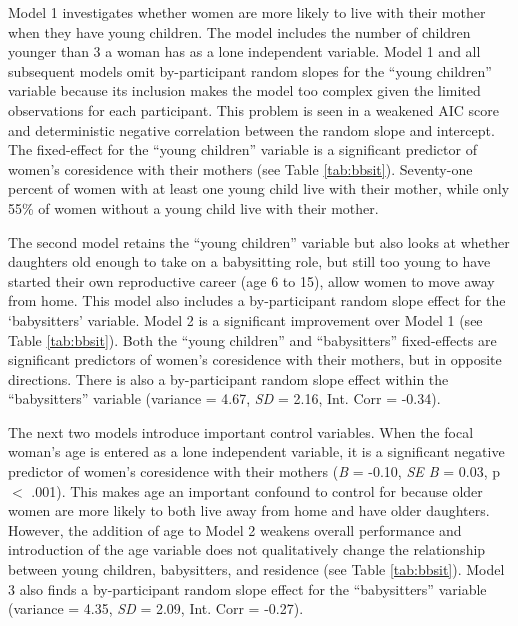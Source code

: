 \documentclass[10pt]{article}
\begin{document}
Model 1 investigates whether women are more likely to live with their mother when they have young children.  The model includes the number of children younger than 3 a woman has as a lone independent variable.  Model 1 and all subsequent models omit by-participant random slopes for the ``young children'' variable because its inclusion makes the model too complex given the limited observations for each participant.  This problem is seen in a weakened AIC score and deterministic negative correlation between the random slope and intercept.  The fixed-effect for the ``young children'' variable is a significant predictor of women's coresidence with their mothers (see Table \ref{tab:bbsit}).  Seventy-one percent of women with at least one young child live with their mother, while only 55\% of women without a young child live with their mother.

The second model retains the ``young children'' variable but also looks at whether daughters old enough to take on a babysitting role, but still too young to have started their own reproductive career (age 6 to 15), allow women to move away from home.  This model also includes a by-participant random slope effect for the `babysitters' variable.  Model 2 is a significant improvement over Model 1 (see Table \ref{tab:bbsit}).  Both the ``young children'' and ``babysitters'' fixed-effects are significant predictors of women's coresidence with their mothers, but in opposite directions.  There is also a by-participant random slope effect within the ``babysitters'' variable (variance = 4.67, \emph{SD} = 2.16, Int. Corr = -0.34).  

The next two models introduce important control variables.  When the focal woman's age is entered as a lone independent variable, it is a significant negative predictor of women's coresidence with their mothers (\emph{B} = -0.10, \emph{SE B} = 0.03, p $<$ .001).  This makes age an important confound to control for because older women are more likely to both live away from home and have older daughters.  However, the addition of age to Model 2 weakens overall performance and introduction of the age variable does not qualitatively change the relationship between young children, babysitters, and residence (see Table \ref{tab:bbsit}).  Model 3 also finds a by-participant random slope effect for the ``babysitters'' variable (variance = 4.35, \emph{SD} = 2.09, Int. Corr = -0.27).  
\end{document}
